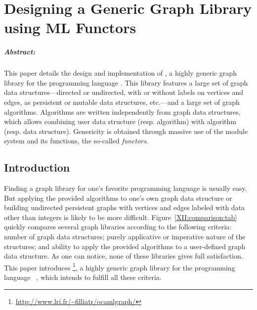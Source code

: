 
\chapter{Designing a Generic Graph Library using ML Functors}



\addtocounter{footnote}{2}


\paragraph{Abstract:}
  This paper details the design and implementation of \ocamlgraph, a
  highly generic graph library for the programming language \ocaml.
  This library features a large set of graph data
  structures---directed or undirected, with or without labels on
  vertices and edges, as persistent or mutable data structures,
  etc.---and a large set of graph algorithms.  Algorithms are written
  independently from graph data structures, which allows combining
  user data structure (resp. algorithm) with \ocamlgraph algorithm
  (resp. data structure).  Genericity is obtained through massive use
  of the \ocaml module system and its functions, the so-called
  \emph{functors}.



\section{Introduction}

Finding a graph library for one's favorite programming language is
usually easy. But applying the provided algorithms to one's own graph
data structure or building undirected persistent graphs with vertices
and edges labeled with data other than integers is likely to be more
difficult. Figure~\ref{XII:comparison:tab} quickly compares several graph
libraries according to the following criteria: number of graph data
structures; purely applicative or imperative nature of the structures;
and ability to apply the provided algorithms to a user-defined graph
data structure.  As one can notice, none of these libraries gives full
satisfaction.  This paper introduces
\ocamlgraph\footnote{\url{http://www.lri.fr/~filliatr/ocamlgraph/}}, a
highly generic graph library for the programming language
\ocaml~\cite{XII:ObjectiveCaml}, which intends to fulfill all these
criteria.


